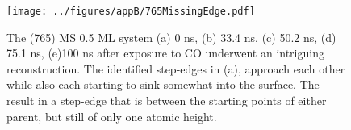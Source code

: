 \begin{landscape}
\begin{figure}
\centering
\texttt{[image: ../figures/appB/765MissingEdge.pdf]}
\caption{The (765) MS 0.5 ML system (a) 0 ns, (b) 33.4 ns, (c) 50.2 ns, (d)
75.1 ns, (e)100 ns after exposure to CO underwent an intriguing reconstruction.
The identified step-edges in (a), approach each other while also each starting
to sink somewhat into the surface. The result in a step-edge that is between
the starting points of either parent, but still of only one atomic height.}
\label{fig:765Edge}
\end{figure}
\end{landscape}
\newpage

